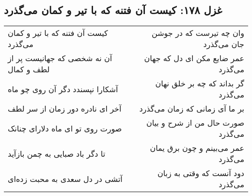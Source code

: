 \begin{center}
\section*{غزل ۱۷۸: کیست آن فتنه که با تیر و کمان می‌گذرد}
\label{sec:178}
\begin{longtable}{l p{0.5cm} r}
کیست آن فتنه که با تیر و کمان می‌گذرد
&&
وان چه تیرست که در جوشن جان می‌گذرد
\\
آن نه شخصی که جهانیست پر از لطف و کمال
&&
عمر ضایع مکن ای دل که جهان می‌گذرد
\\
آشکارا نپسندد دگر آن روی چو ماه
&&
گر بداند که چه بر خلق نهان می‌گذرد
\\
آخر ای نادره دور زمان از سر لطف
&&
بر ما آی زمانی که زمان می‌گذرد
\\
صورت روی تو ای ماه دلارای چنانک
&&
صورت حال من از شرح و بیان می‌گذرد
\\
تا دگر باد صبایی به چمن بازآید
&&
عمر می‌بینم و چون برق یمان می‌گذرد
\\
آتشی در دل سعدی به محبت زده‌ای
&&
دود آنست که وقتی به زبان می‌گذرد
\\
\end{longtable}
\end{center}
